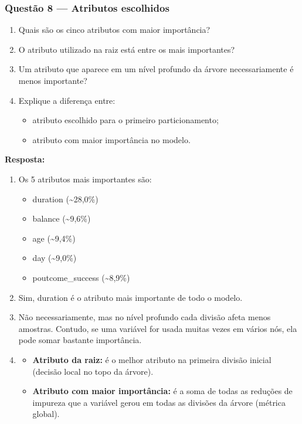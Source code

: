\documentclass[11pt]{article}
\providecommand{\tightlist}{%
      \setlength{\itemsep}{0pt}\setlength{\parskip}{0pt}}
\begin{document}
    \subsubsection{Questão 8 --- Atributos
escolhidos}\label{questuxe3o-8-atributos-escolhidos}

\begin{enumerate}
\def\labelenumi{\arabic{enumi}.}
\tightlist
\item
  Quais são os cinco atributos com maior importância?
\item
  O atributo utilizado na raiz está entre os mais importantes?
\item
  Um atributo que aparece em um nível profundo da árvore necessariamente
  é menos importante?
\item
  Explique a diferença entre:

  \begin{itemize}
  \tightlist
  \item
    atributo escolhido para o primeiro particionamento;
  \item
    atributo com maior importância no modelo.
  \end{itemize}
\end{enumerate}

\textbf{Resposta:}

    \begin{enumerate}
\def\labelenumi{\arabic{enumi}.}
\tightlist
\item
  Os 5 atributos mais importantes são:

  \begin{itemize}
  \tightlist
  \item
    duration (\textasciitilde28,0\%)
  \item
    balance (\textasciitilde9,6\%)
  \item
    age (\textasciitilde9,4\%)
  \item
    day (\textasciitilde9,0\%)
  \item
    poutcome\_success (\textasciitilde8,9\%)
  \end{itemize}
\item
  Sim, duration é o atributo mais importante de todo o modelo.
\item
  Não necessariamente, mas no nível profundo cada divisão afeta menos
  amostras. Contudo, se uma variável for usada muitas vezes em vários
  nós, ela pode somar bastante importância.
\item
  \begin{itemize}
  \tightlist
  \item
    \textbf{Atributo da raiz:} é o melhor atributo na primeira divisão
    inicial (decisão local no topo da árvore).
  \item
    \textbf{Atributo com maior importância:} é a soma de todas as
    reduções de impureza que a variável gerou em todas as divisões da
    árvore (métrica global).
  \end{itemize}
\end{enumerate}
\end{document}

